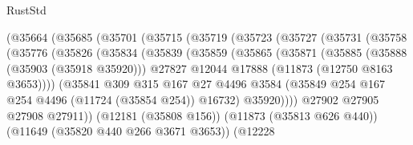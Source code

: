 \begin{lexlean}{RustStd}
\begin{coremodule}
                        (@35664
                          (@35685
                            (@35701
                              (@35715
                                (@35719
                                  (@35723
                                    (@35727
                                      (@35731
                                        (@35758
                                          (@35776
                                            (@35826
                                              (@35834
                                                (@35839
                                                  (@35859
                                                    (@35865
                                                      (@35871
                                                        (@35885
                                                          (@35888 (@35903 (@35918 @35920)))
                                                          @27827
                                                          @12044
                                                          @17888
                                                          (@11873 (@12750 @8163 @3653))))
                                                      (@35841
                                                        @309
                                                        @315
                                                        @167
                                                        @27
                                                        @4496
                                                        @3584
                                                        (@35849
                                                          @254
                                                          @167
                                                          @254
                                                          @4496
                                                          (@11724 (@35854 @254))
                                                          @16732)
                                                        @35920))))
                                                @27902
                                                @27905
                                                @27908
                                                @27911))
                                            (@12181 (@35808 @156))
                                            (@11873 (@35813 @626 @440))
                                            (@11649 (@35820 @440 @266 @3671 @3653))
                                            (@12228

\end{coremodule}
\end{lexlean}
